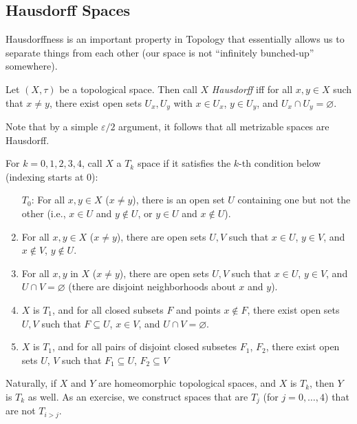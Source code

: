 \documentclass{fkbook}
\theoremstyle{snazzydefinition}
\begin{document}
\begin{adjustwidth}{1em}{1em}
  \section{Hausdorff Spaces}
  Hausdorffness is an important property in Topology that essentially
  allows us to separate things from each other (our space is not
  ``infinitely bunched-up'' somewhere).
  \begin{definition}
    Let $(X, \tau)$ be a topological space. Then call $X$
    \emph{Hausdorff} iff for all $x, y \in X$ such that $x \neq y$,
    there exist open sets $U_x, U_y$ with $x \in U_x$, $y \in U_y$,
    and $U_x \cap U_y = \varnothing$.
  \end{definition}
  Note that by a simple $\varepsilon/2$ argument, it follows that all
  metrizable spaces are Hausdorff.
  \begin{definition}[$T_k$ spaces]
    For $k = 0, 1, 2, 3, 4$, call $X$ a $T_k$ space if it satisfies
    the $k$-th condition below (indexing starts at 0):
    \begin{enumerate}[label=$T_\arabic*$:]
      \item[$T_0$:] For all $x,y \in X$ ($x \neq y$), there is an open
        set $U$ containing one but not the other (i.e., $x \in U$ and
        $y \not \in U$, or $y \in U$ and $x \not \in U$).
      \item For all $x,y \in X$ ($x \neq y$), there are open sets
        $U,V$ such that $x \in U$, $y \in V$, and $x \not \in V$, $y
        \not\in U$.
      \item For all $x,y$ in $X$ ($x \neq y$), there are open sets $U,
        V$ such that $x \in U$, $y \in V$, and $U \cap V =
        \varnothing$ (there are disjoint neighborhoods about $x$ and
        $y$).
      \item $X$ is $T_1$, and for all closed subsets $F$ and points $x
        \not \in F$, there exist open sets $U,V$ such that $F
        \subseteq U$, $x \in V$, and $U \cap V = \varnothing$.
      \item $X$ is $T_1$, and for all pairs of disjoint closed
        subsetes $F_1$, $F_2$, there exist open sets $U$, $V$ such
        that $F_1 \subseteq U$, $F_2 \subseteq V$
    \end{enumerate}
  \end{definition}
  Naturally, if $X$ and $Y$ are homeomorphic topological spaces, and
  $X$ is $T_k$, then $Y$ is $T_k$ as well. As an exercise, we
  construct spaces that are $T_j$ (for $j = 0, \ldots, 4$) that are
  not $T_{i > j}$.
  \begin{enumerate}[label=($X_\arabic*)$:]

\end{enumerate}
\end{adjustwidth}
\end{document}
